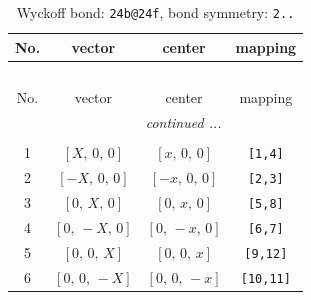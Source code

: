 \documentclass[fleqn,8pt]{jsarticle}
\begin{document}
\begin{longtable}{cccc}
\caption{Wyckoff bond: {\tt 24b@24f}, bond symmetry: {\tt 2..}}
 \\
 \hline \hline
No. & vector & center & mapping \\ \hline \endfirsthead

\multicolumn{3}{l}{\tablename\ \thetable{}} \\
 \hline \hline
No. & vector & center & mapping \\ \hline \endhead

 \hline \hline
\multicolumn{3}{r}{\footnotesize\it continued ...} \\ \endfoot

 \hline \hline
\multicolumn{3}{r}{} \\ \endlastfoot

1 & $\left[ X,\, 0,\, 0 \right]$ & $\left[ x,\, 0,\, 0 \right]$ & {\tt [1,4]} \\ \hline
2 & $\left[ - X,\, 0,\, 0 \right]$ & $\left[ - x,\, 0,\, 0 \right]$ & {\tt [2,3]} \\ \hline
3 & $\left[ 0,\, X,\, 0 \right]$ & $\left[ 0,\, x,\, 0 \right]$ & {\tt [5,8]} \\ \hline
4 & $\left[ 0,\, - X,\, 0 \right]$ & $\left[ 0,\, - x,\, 0 \right]$ & {\tt [6,7]} \\ \hline
5 & $\left[ 0,\, 0,\, X \right]$ & $\left[ 0,\, 0,\, x \right]$ & {\tt [9,12]} \\ \hline
6 & $\left[ 0,\, 0,\, - X \right]$ & $\left[ 0,\, 0,\, - x \right]$ & {\tt [10,11]} \\
\end{longtable}
\renewcommand{\arraystretch}{1.2}
\end{document}

